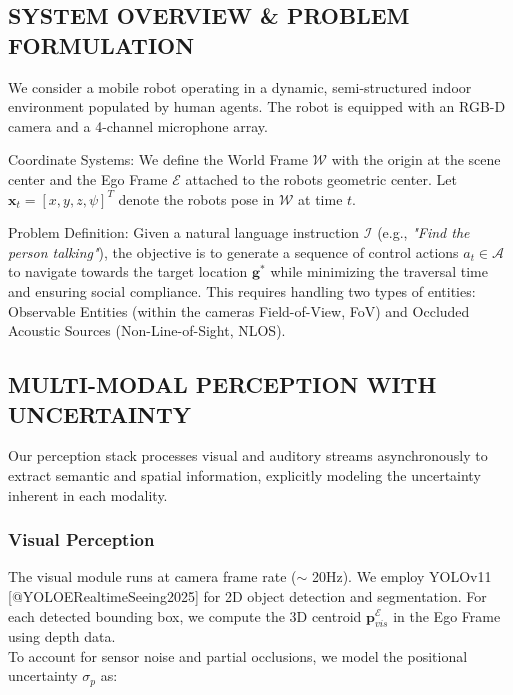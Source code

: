 \documentclass[
]{article}
\author{}
\date{}
\begin{document}
\subsection{SYSTEM OVERVIEW \& PROBLEM
FORMULATION}\label{system-overview--problem-formulation}

We consider a mobile robot operating in a dynamic, semi-structured
indoor environment populated by human agents. The robot is equipped with
an RGB-D camera and a 4-channel microphone array.

Coordinate Systems: We define the World Frame \(\mathcal{W}\) with the
origin at the scene center and the Ego Frame \(\mathcal{E}\) attached to
the robot\textquotesingle s geometric center. Let
\(\mathbf{x}_t = [x, y, z, \psi]^T\) denote the robot\textquotesingle s
pose in \(\mathcal{W}\) at time \(t\).

Problem Definition: Given a natural language instruction \(\mathcal{I}\)
(e.g., \emph{"Find the person talking"}), the objective is to generate a
sequence of control actions \(a_{t} \in \mathcal{A}\) to navigate
towards the target location \(\mathbf{g}^*\) while minimizing the
traversal time and ensuring social compliance. This requires handling
two types of entities: Observable Entities (within the
camera\textquotesingle s Field-of-View, FoV) and Occluded Acoustic
Sources (Non-Line-of-Sight, NLOS).

\subsection{MULTI-MODAL PERCEPTION WITH
UNCERTAINTY}\label{multi-modal-perception-with-uncertainty}

Our perception stack processes visual and auditory streams
asynchronously to extract semantic and spatial information, explicitly
modeling the uncertainty inherent in each modality.

\subsubsection{Visual Perception}\label{visual-perception}

The visual module runs at camera frame rate (\(\sim\) 20Hz). We employ
YOLOv11 {[}@YOLOERealtimeSeeing2025{]} for 2D object detection and
segmentation. For each detected bounding box, we compute the 3D centroid
\(\mathbf{p}_{vis}^{\mathcal{E}}\) in the Ego Frame using depth data.\\
To account for sensor noise and partial occlusions, we model the
positional uncertainty \(\sigma_{p}\) as:
\end{document}
